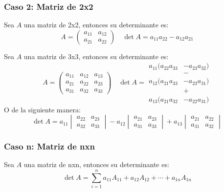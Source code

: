 \documentclass{beamer}
\begin{document}
    \begin{frame}
        \frametitle{Caso 2: Matriz de 2x2}
        Sea $A$ una matriz de 2x2, entonces su determinante es:
        $$
        A =
        \begin{pmatrix}
            a_{11} & a_{12} \\
            a_{21} & a_{22}
        \end{pmatrix}
        \quad \det{A} = a_{11}a_{22} - a_{12}a_{21}
        $$
    \end{frame}

    \begin{frame}
        Sea $A$ una matriz de 3x3, entonces su determinante es:
        $$
        A =
        \begin{pmatrix}
            a_{11} & a_{12} & a_{13} \\
            a_{21} & a_{22} & a_{23} \\
            a_{31} & a_{32} & a_{33}
        \end{pmatrix}
        \quad \det{A} =
        \begin{align*}
            a_{11}(a_{22}a_{33} &- a_{23}a_{32}) \\
            &- \\
            a_{12}(a_{21}a_{33} &- a_{23}a_{31}) \\
            &+ \\
            a_{13}(a_{21}a_{32} &- a_{22}a_{31})
        \end{align*}
        $$
        O de la siguiente manera:
        $$
        \det{A} = a_{11}\begin{vmatrix}a_{22} & a_{23}\\ a_{32} & a_{33}\end{vmatrix} - a_{12}\begin{vmatrix}a_{21} & a_{23}\\ a_{31} & a_{33}\end{vmatrix} + a_{13}\begin{vmatrix}a_{21} & a_{22}\\ a_{31} & a_{32}\end{vmatrix}
        $$
    \end{frame}

        \begin{frame}
            \frametitle{Caso n: Matriz de nxn}
            Sea $A$ una matriz de nxn, entonces su determinante es:
            $$
            \det{A} = \sum_{i=1}^{n} a_{11}A_{11} + a_{12}A_{12} + \cdots + a_{1n}A_{1n}
            $$
        \end{frame}
\end{document}
